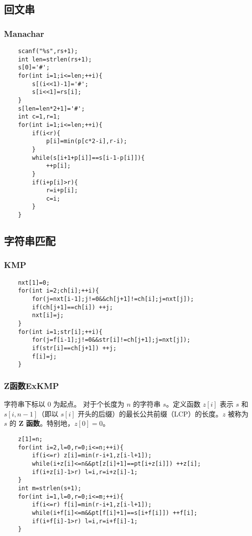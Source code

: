 \documentclass[UTF8]{ctexart}
\begin{document}
\subsection{回文串}
\subsubsection{Manachar}
\begin{lstlisting}
	scanf("%s",rs+1);
	int len=strlen(rs+1);
	s[0]='#';
	for(int i=1;i<=len;++i){
		s[(i<<1)-1]='#';
		s[i<<1]=rs[i];
	}
	s[len=len*2+1]='#';
	int c=1,r=1;
	for(int i=1;i<=len;++i){
		if(i<r){
			p[i]=min(p[c*2-i],r-i);
		}
		while(s[i+1+p[i]]==s[i-1-p[i]]){
			++p[i];
		}
		if(i+p[i]>r){
			r=i+p[i];
			c=i;
		}
	}
\end{lstlisting}
\subsection{字符串匹配}
\subsubsection{KMP}
\begin{lstlisting}
	nxt[1]=0;
	for(int i=2;ch[i];++i){
		for(j=nxt[i-1];j!=0&&ch[j+1]!=ch[i];j=nxt[j]);
		if(ch[j+1]==ch[i]) ++j;
		nxt[i]=j;
	}
	for(int i=1;str[i];++i){
		for(j=f[i-1];j!=0&&str[i]!=ch[j+1];j=nxt[j]);
		if(str[i]==ch[j+1]) ++j;
		f[i]=j;
	}
\end{lstlisting}
\subsubsection{Z函数ExKMP}
字符串下标以 $0$ 为起点。
对于个长度为 $n$ 的字符串 $s$。定义函数 $z[i]$ 表示 $s$ 和 $s[i,n-1]$（即以 $s[i]$ 开头的后缀）的最长公共前缀（LCP）的长度。$z$ 被称为 $s$ 的 \textbf{Z 函数}。特别地，$z[0] = 0$。
\begin{lstlisting}
	z[1]=n;
	for(int i=2,l=0,r=0;i<=n;++i){
		if(i<=r) z[i]=min(r-i+1,z[i-l+1]);
		while(i+z[i]<=n&&pt[z[i]+1]==pt[i+z[i]]) ++z[i];
		if(i+z[i]-1>r) l=i,r=i+z[i]-1;
	}
	int m=strlen(s+1);
	for(int i=1,l=0,r=0;i<=m;++i){
		if(i<=r) f[i]=min(r-i+1,z[i-l+1]);
		while(i+f[i]<=m&&pt[f[i]+1]==s[i+f[i]]) ++f[i];
		if(i+f[i]-1>r) l=i,r=i+f[i]-1;
	}
\end{lstlisting}
\end{document}
